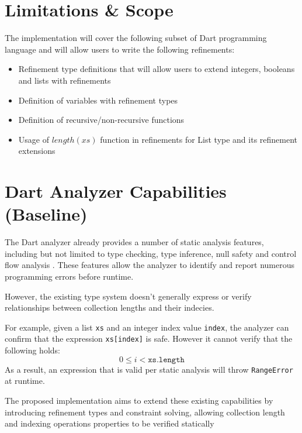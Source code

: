 \section{Limitations \& Scope}
\label{sec:limitations_and_scope}
The implementation will cover the following subset of Dart programming language and will allow users to write the following refinements:
\begin{itemize}
    \item Refinement type definitions that will allow users to extend integers, booleans and lists with refinements
    \item Definition of variables with refinement types
    \item Definition of recursive/non-recursive functions
    \item Usage of $length(xs)$ function in refinements for List type and its refinement extensions
\end{itemize}

\section{Dart Analyzer Capabilities (Baseline)}
\label{sec:dart_baseline}
The Dart analyzer already provides a number of static analysis features, including but
not limited to type checking, type inference, null safety and control flow analysis \cite{DartlangLanguage2026}.
These features allow the analyzer to identify and report numerous programming errors before runtime.

However, the existing type system doesn't generally express or verify relationships
between collection lengths and their indecies.

For example, given a list \texttt{xs} and an integer index value \texttt{index}, the analyzer
can confirm that the expression \texttt{xs[index]} is safe. However it cannot verify that
the following holds:
\[
0 \leq i < \texttt{xs.length}
\]
As a result, an expression that is valid per static analysis will throw \texttt{RangeError}
at runtime.

The proposed implementation aims to extend these existing
capabilities by introducing refinement types and constraint
solving, allowing collection length and indexing operations properties
to be verified statically

